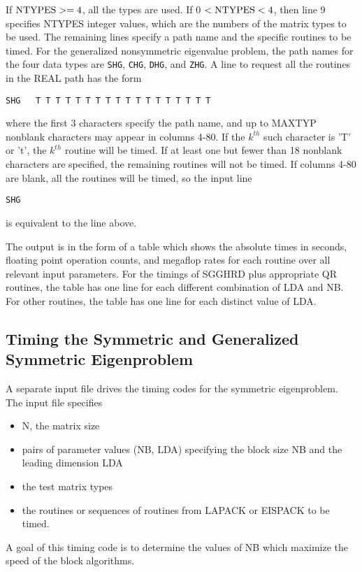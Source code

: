 \noindent
If ${\rm NTYPES} >= 4 $, all the types are used.
If 0 $< {\rm NTYPES} < 4 $, then line 9 specifies NTYPES integer
values, which are the numbers of the matrix types to be used.
The remaining lines specify a path name and the specific routines to
be timed.  For the generalized nonsymmetric eigenvalue problem, the
path names for the four data types are {\tt SHG}, {\tt CHG}, {\tt DHG},
and {\tt ZHG}.  A line to request all the routines in the REAL path has
the form
\begin{verbatim}
SHG   T T T T T T T T T T T T T T T T T T
\end{verbatim}
where the first 3 characters specify the path name, and up to MAXTYP
nonblank characters may appear in columns 4-80.  If the $k^{th}$ such
character is 'T' or 't', the $k^{th}$ routine will be timed.  If at least
one but fewer than 18 nonblank characters are specified, the
remaining routines will not be timed.  If columns 4-80 are blank, all
the routines will be timed, so the input line
\begin{verbatim}
SHG
\end{verbatim}
is equivalent to the line above.

The output is in the form of a table which shows
the absolute times in seconds,
floating point operation counts,
and megaflop rates for each routine
over all relevant input parameters.
For the timings of SGGHRD plus appropriate QR routines,
the table has one line for
each different combination of LDA and NB.
For other routines, the table has one line for each
distinct value of LDA.

\subsection{Timing the Symmetric and Generalized Symmetric Eigenproblem}

\dent
A separate input file drives the timing codes for the symmetric 
eigenproblem. The input file specifies
\begin{itemize}
\item N, the matrix size
\item pairs of parameter values (NB, LDA) specifying the
block size NB and the leading dimension LDA
\item the test matrix types
\item the routines or sequences of routines from LAPACK or EISPACK
to be timed.
\end{itemize}
A goal of this timing code is to determine
the values of NB which maximize the speed of the block algorithms.

